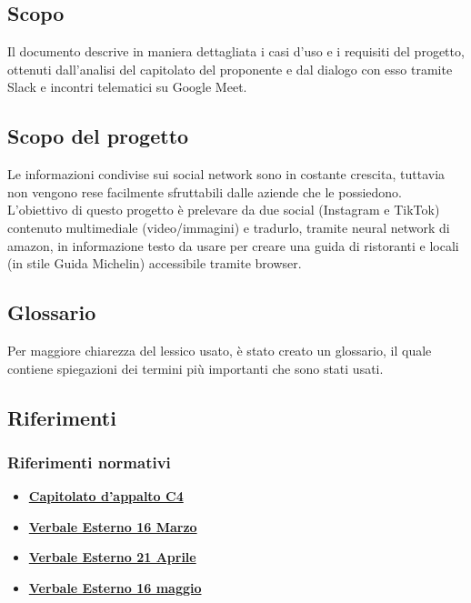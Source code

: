 \subsection{Scopo}
Il documento descrive in maniera dettagliata i casi d'uso e i requisiti del progetto, 
ottenuti dall'analisi del capitolato del proponente \proponente{} e dal dialogo con esso tramite Slack e incontri telematici su Google Meet.

\subsection{Scopo del progetto}
Le informazioni condivise sui social network sono in costante crescita, tuttavia 
non vengono rese facilmente sfruttabili dalle aziende che le possiedono. 
L'obiettivo di questo progetto è prelevare da due social (Instagram e TikTok) 
contenuto multimediale (video/immagini) e tradurlo, tramite neural network di 
amazon, in informazione testo da usare per creare una guida di ristoranti e locali
(in stile Guida Michelin) accessibile tramite browser. 

\subsection{Glossario}
Per maggiore chiarezza del lessico usato, è stato creato un glossario, il quale 
contiene spiegazioni dei termini più importanti che sono stati usati.

\subsection{Riferimenti}
\subsubsection{Riferimenti normativi}
\begin{itemize}
	\item
	\href{https://www.math.unipd.it/~tullio/IS-1/2021/Progetto/C4.pdf}{\textbf{Capitolato d'appalto C4}}
    \item
    \href{https://github.com/Bug-s-Bunny-Team/docs/blob/dev/src/Esterni/Verbali/ve_20220316.tex}{\textbf{Verbale Esterno 16 Marzo}}
    \item
	\href{https://github.com/Bug-s-Bunny-Team/docs/blob/dev/src/Esterni/Verbali/ve_20220421.tex}{\textbf{Verbale Esterno 21 Aprile}}
    \item
	\href{https://github.com/Bug-s-Bunny-Team/docs/blob/dev/src/Esterni/Verbali/ve_20220516.tex}{\textbf{Verbale Esterno 16 maggio}}

\end{itemize}
